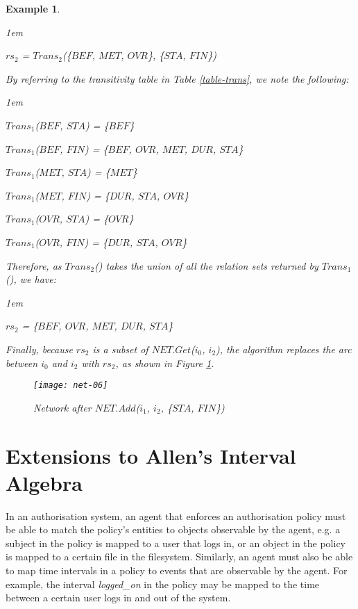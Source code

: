 \documentclass[11pt]{report}
\newtheorem{vexample}{Example}[chapter]
\newenvironment{vquote}
{
  \begin{list}{}{\leftmargin 1em}\item[]
}
{
  \end{list}
}
\begin{document}
\begin{vexample}
\begin{vquote}
              $rs_2$ = $Trans_2$(\{$BEF$, $MET$, $OVR$\}, \{$STA$, $FIN$\})
            \end{vquote}

            By referring to the transitivity table in Table \ref{table-trans},
            we note the following:

            \begin{vquote}
              $Trans_1$($BEF$, $STA$) = \{$BEF$\}

              $Trans_1$($BEF$, $FIN$) = \{$BEF$, $OVR$, $MET$, $DUR$, $STA$\}

              $Trans_1$($MET$, $STA$) = \{$MET$\}

              $Trans_1$($MET$, $FIN$) = \{$DUR$, $STA$, $OVR$\}

              $Trans_1$($OVR$, $STA$) = \{$OVR$\}

              $Trans_1$($OVR$, $FIN$) = \{$DUR$, $STA$, $OVR$\}
            \end{vquote}

            Therefore, as $Trans_2$() takes the union of all the relation sets
            returned by $Trans_1$(), we have:

            \begin{vquote}
              $rs_2$ = \{$BEF$, $OVR$, $MET$, $DUR$, $STA$\}
            \end{vquote}

            Finally, because $rs_2$ is a subset of $NET.Get$($i_0$, $i_2$), the
            algorithm replaces the arc between $i_0$ and $i_2$ with $rs_2$, as
            shown in Figure \ref{fig-net-ex-06}.

            \begin{figure}[[tbhp]
              \begin{center}
                \texttt{[image: net-06]}
                \caption{Network after $NET.Add$($i_1$, $i_2$, \{$STA$, $FIN$\})}
                \label{fig-net-ex-06}
              \end{center}
            \end{figure}
          \end{vexample}

    \section{Extensions to Allen's Interval Algebra}

      In an authorisation system, an agent that enforces an authorisation
      policy must be able to match the policy's entities to objects observable
      by the agent, e.g. a subject in the policy is mapped to a user that logs
      in, or an object in the policy is mapped to a certain file in the
      filesystem. Similarly, an agent must also be able to map time intervals
      in a policy to events that are observable by the agent. For example,
      the interval {\em logged\_on} in the policy may be mapped to the time
      between a certain user logs in and out of the system.
\end{document}
